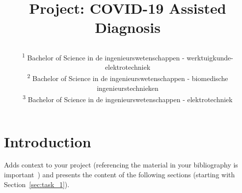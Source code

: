 \documentclass[conference]{IEEEtran}
\begin{document}
\title{Project: COVID-19 Assisted Diagnosis\\


\author{
\and
{}
\and
{}
\and
{}
\and

\textsuperscript{1} Bachelor of Science in de ingenieurswetenschappen - werktuigkunde-elektrotechniek \hfill\\
\textsuperscript{2} Bachelor of Science in de ingenieurswetenschappen - biomedische ingenieurstechnieken\hfill\\
\textsuperscript{3}  Bachelor of Science in de ingenieurswetenschappen - elektrotechniek\hfill}
}
\maketitle



\section{Introduction}
Adds context to your project (referencing the material in your bibliography is important~\cite{b1, b2}) and presents the content of the following sections (starting with Section~\ref{sec:task_1}).
\end{document}

